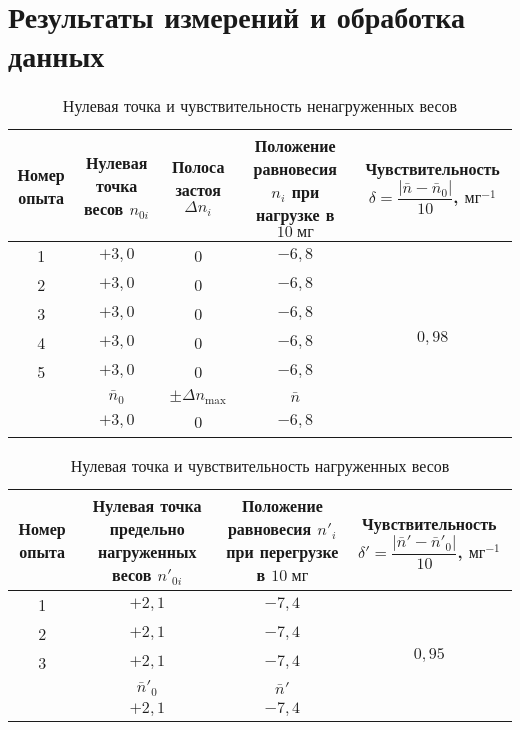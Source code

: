 \section{Результаты измерений и обработка данных}


\begin{table}[h]
	\begin{center}
	\begin{tabular}{|c|c|c|c|c|}
		\hline
		\parbox[c][7em]{3em}{Номер опыта} & \parbox{6em}{Нулевая точка весов $n_{0i}$} & \parbox{5em}{Полоса застоя $\Delta n_i$} & \parbox{6em}{Положение равновесия $n_i$ при нагрузке в $10\;\text{мг}$} & \parbox{9em}{Чувствительность $\delta=\dfrac{|\bar n-\bar n_0|}{10}$, $\text{мг}^{-1}$} \\
		\hline
		 & $+3{,}0$ & 0 & $-6{,}8$ &  \\
		2 & $+3{,}0$ & 0 & $-6{,}8$ & \\
		3 & $+3{,}0$ & 0 & $-6{,}8$ & \\
		4 & $+3{,}0$ & 0 & $-6{,}8$ & \\
		5 & $+3{,}0$ & 0 & $-6{,}8$ & \\
		& $\bar n_0$ & $\pm\Delta n_\text{max}$ & $\bar n$ & \\
		& $+3{,}0$ & 0 & $-6{,}8$ & \\
		\hline
	\end{tabular}
	\caption{Нулевая точка и чувствительность ненагруженных весов}\label{TbOne}
	\end{center}
\end{table}

\begin{table}[h]
	\begin{center}
	\begin{tabular}{|c|c|c|c|}
		\hline
		\parbox[c][7em]{3em}{Номер опыта} & \parbox{6em}{Нулевая точка предельно нагруженных весов $n'_{0i}$} & \parbox{6em}{Положение равновесия $n'_i$ при перегрузке в $10\;\text{мг}$} & \parbox{9em}{Чувствительность $\delta'=\dfrac{|\bar n'-\bar n'_0|}{10}$, $\text{мг}^{-1}$} \\
		\hline
		 & $+2{,}1$ & $-7{,}4$ &  \\
		2 & $+2{,}1$ & $-7{,}4$ & \\
		3 & $+2{,}1$ & $-7{,}4$ & \\
		& $\bar n'_0$ & $\bar n'$ & \\
		& $+2{,}1$ & $-7{,}4$ & \\
		\hline
	\end{tabular}
	\caption{Нулевая точка и чувствительность нагруженных весов}\label{TbTwo}
	\end{center}
\end{table}

